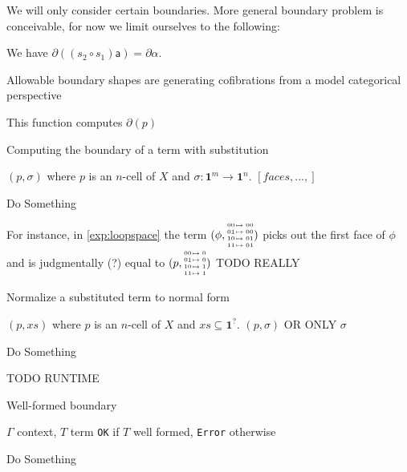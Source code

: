 \documentclass[11pt]{article}
\theoremstyle{definition}
\newcommand{\pint}[1]{\mathbf{1}^{#1}}
\newcommand{\smap}[1]{s_{{#1}}}
\newcommand{\cset}[1]{\mathsf{{#1}}}
\newcommand{\boundary}[1]{\partial({#1})}
\newcommand{\substfour}[4]{\tiny
  \arraycolsep=.4pt\def\arraystretch{1}
  \begin{array}{ll}
    00 &\mapsto {#1} \\
    01 &\mapsto {#2} \\
    10 &\mapsto {#3} \\
    11 &\mapsto {#4} 
  \end{array}
}
\begin{document}
We will only consider certain boundaries. More general boundary problem is
conceivable, for now we limit ourselves to the following:

We have $\partial ((\smap{2} \circ \smap{1}) \cset{a}) = \partial{\cset{\alpha}}$.


Allowable boundary shapes are generating cofibrations from a model categorical perspective

This function computes $\boundary{p}$

\begin{algorithm}[H]
  \caption{Computing the boundary of a term with substitution}\label{alg:boundary}
  \begin{algorithmic}
    \Require $(p, \sigma)$ where $p$ is an $n$-cell of $X$ and $\sigma : \pint{m} \to \pint{n}$.
    \Ensure $[faces , ... , ]$
    
    \State Do Something
    \EndProcedure

  \end{algorithmic}
\end{algorithm}

For instance, in \autoref{exp:loopspace} the term
$(\phi,\substfour{00}{00}{01}{01})$ picks out the first face of $\phi$ and
is judgmentally (?) equal to $(p,\substfour{0}{0}{1}{1})$ TODO REALLY

\begin{algorithm}[H]
  \caption{Normalize a substituted term to normal form}\label{alg:normalize}
  \begin{algorithmic}
    \Require $(p, xs)$ where $p$ is an $n$-cell of $X$ and $xs \subseteq \pint{?}$.
    \Ensure $(p,\sigma)$ OR ONLY $\sigma$

    \State Do Something
    \EndProcedure
  \end{algorithmic}
\end{algorithm}

TODO RUNTIME

\begin{algorithm}[H]
  \caption{Well-formed boundary}\label{alg:wellformedboundary}
  \begin{algorithmic}
    \Require $\Gamma$ context, $T$ term
    \Ensure \texttt{OK} if $T$ well formed, \texttt{Error} otherwise

    \State Do Something
    \EndProcedure
  \end{algorithmic}
\end{algorithm}
\end{document}
